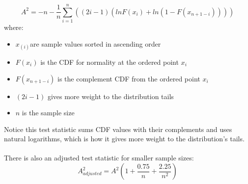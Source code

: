 \documentclass[preview]{standalone}
\begin{document}
{\Large
\[
A^2=-n-\frac{1}{n}\sum^n_{i=1}((2i-1)(lnF(x_i)+ln(1-F(x_{n+1-i}))))
\]
}
where:
\begin{itemize}
	\setlength\itemsep{0.1em}
	\item $x_{(i)}$are sample values sorted in ascending order
	\item $F(x_i)$ is the CDF for normality at the ordered point $x_i$
	\item $F(x_{n+1-i})$ is the complement CDF from the ordered point $x_i$
	\item $(2i-1)$ gives more weight to the distribution tails
	\item $n$ is the sample size
\end{itemize}
Notice this test statistic sums CDF values with their complements and uses natural logarithms, which is how it gives more weight to the distribution's tails.
\\\\
There is also an adjusted test statistic for smaller sample sizes:
{\Large
\[
A^2_{adjusted}=A^2\left(1+\frac{0.75}{n}+\frac{2.25}{n^2}\right)
\]
}
\end{document}
